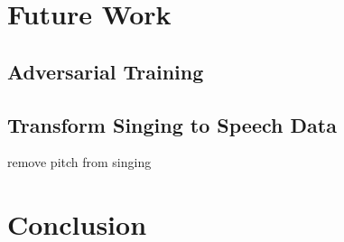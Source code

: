 \documentclass[letterpaper, 12pt]{article}
\begin{document}
\begin{multicols*}{2}
\section{Future Work}
\subsection{Adversarial Training}
\subsection{Transform Singing to Speech Data}
remove pitch from singing


\section{Conclusion}



\end{multicols*}
\end{document}
